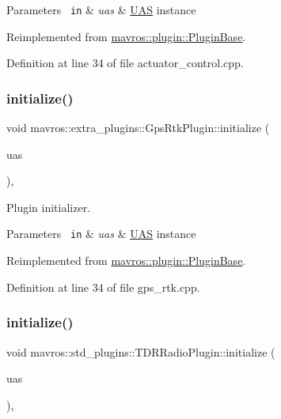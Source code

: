 \begin{DoxyParams}[1]{Parameters}
\mbox{\texttt{ in}}  & {\em uas} & {\ttfamily \mbox{\hyperlink{classmavros_1_1UAS}{U\+AS}}} instance \\
\hline
\end{DoxyParams}


Reimplemented from \mbox{\hyperlink{group__plugin_gad5313a41da4d26acbbabf008cdc21e82}{mavros\+::plugin\+::\+Plugin\+Base}}.



Definition at line 34 of file actuator\+\_\+control.\+cpp.

\mbox{\label{group__plugin_ga4d0ded3217149d886fba09768c5093ca}} 
\subsubsection{\texorpdfstring{initialize()}{initialize()}\hspace{0.1cm}{\footnotesize\ttfamily [5/41]}}
{\footnotesize\ttfamily void mavros\+::extra\+\_\+plugins\+::\+Gps\+Rtk\+Plugin\+::initialize (\begin{DoxyParamCaption}\item[{\mbox{\hyperlink{classmavros_1_1UAS}{U\+AS}} \&}]{uas }\end{DoxyParamCaption})\hspace{0.3cm}{\ttfamily [inline]}, {\ttfamily [virtual]}}



Plugin initializer. 


\begin{DoxyParams}[1]{Parameters}
\mbox{\texttt{ in}}  & {\em uas} & {\ttfamily \mbox{\hyperlink{classmavros_1_1UAS}{U\+AS}}} instance \\
\hline
\end{DoxyParams}


Reimplemented from \mbox{\hyperlink{group__plugin_gad5313a41da4d26acbbabf008cdc21e82}{mavros\+::plugin\+::\+Plugin\+Base}}.



Definition at line 34 of file gps\+\_\+rtk.\+cpp.

\mbox{\label{group__plugin_ga396d464187dbf5852122abce024b6acd}} 
\subsubsection{\texorpdfstring{initialize()}{initialize()}\hspace{0.1cm}{\footnotesize\ttfamily [6/41]}}
{\footnotesize\ttfamily void mavros\+::std\+\_\+plugins\+::\+T\+D\+R\+Radio\+Plugin\+::initialize (\begin{DoxyParamCaption}\item[{\mbox{\hyperlink{classmavros_1_1UAS}{U\+AS}} \&}]{uas }\end{DoxyParamCaption})\hspace{0.3cm}{\ttfamily [inline]}, {\ttfamily [virtual]}}



